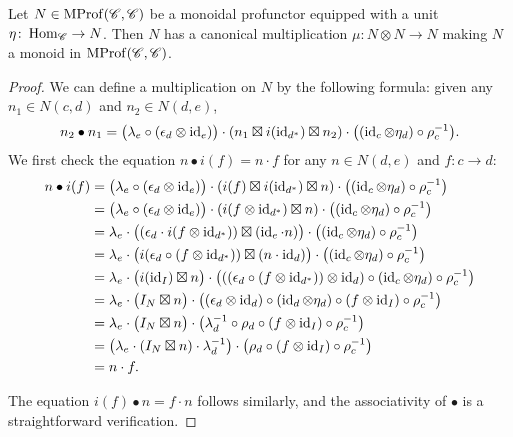 \begin{proposition}
	Let $N\in\operatorname{MProf}(\mathscr{C},\mathscr{C})$ be a monoidal profunctor equipped with a unit $\eta\colon\operatorname{Hom}_{\mathscr{C}}\to N$. Then $N$ has a canonical multiplication $\mu\colon N\otimes N\to N$ making $N$ a monoid in $\operatorname{MProf}(\mathscr{C},\mathscr{C})$.
\end{proposition}
\begin{proof}
	We can define a multiplication on $N$ by the following formula: given any $n_1\in N(c,d)$ and $n_2\in N(d,e)$,
	\[
		n_2\bullet n_1 = \bigl(\lambda_e\circ(\epsilon_d\otimes\operatorname{id}_e)\bigr)\cdot(n_1\boxtimes i(\operatorname{id}_{d^*})\boxtimes n_2)\cdot\bigl((\operatorname{id}_c\otimes \eta_d)\circ\rho_c^{-1}\bigr).
	\]
	We first check the equation $n\bullet i(f)=n\cdot f$ for any $n\in N(d,e)$ and $f\colon c\to d$:
	\begin{align*}
		n\bullet i(f) &= \bigl(\lambda_e\circ(\epsilon_d\otimes\operatorname{id}_e)\bigr)\cdot(i(f)\boxtimes i(\operatorname{id}_{d^*})\boxtimes n)\cdot\bigl((\operatorname{id}_c\otimes \eta_d)\circ\rho_c^{-1}\bigr) \\
		&= \bigl(\lambda_e\circ(\epsilon_d\otimes\operatorname{id}_e)\bigr)\cdot(i(f\otimes\operatorname{id}_{d^*})\boxtimes n)\cdot\bigl((\operatorname{id}_c\otimes \eta_d)\circ\rho_c^{-1}\bigr) \\
		&= \lambda_e\cdot\bigl((\epsilon_d\cdot i(f\otimes \operatorname{id}_{d^*}))\boxtimes (\operatorname{id}_e\cdot n)\bigr)\cdot\bigl((\operatorname{id}_c\otimes \eta_d)\circ\rho_c^{-1}\bigr) \\
		&= \lambda_e\cdot\bigl(i(\epsilon_d\circ (f\otimes \operatorname{id}_{d^*}))\boxtimes (n\cdot\operatorname{id}_d)\bigr)\cdot\bigl((\operatorname{id}_c\otimes \eta_d)\circ\rho_c^{-1}\bigr) \\
		&= \lambda_e\cdot\bigl(i(\operatorname{id}_I)\boxtimes n\bigr)\cdot\bigl(((\epsilon_d\circ (f\otimes \operatorname{id}_{d^*}))\otimes\operatorname{id}_d)\circ(\operatorname{id}_c\otimes \eta_d)\circ\rho_c^{-1}\bigr) \\
		&= \lambda_e\cdot\bigl(I_N\boxtimes n\bigr)\cdot\bigl((\epsilon_d\otimes\operatorname{id}_d)\circ(\operatorname{id}_d\otimes\eta_d)\circ(f\otimes\operatorname{id}_I)\circ\rho_c^{-1}\bigr) \\
		&= \lambda_e\cdot\bigl(I_N\boxtimes n\bigr)\cdot\bigl(\lambda_d^{-1}\circ\rho_d\circ(f\otimes\operatorname{id}_I)\circ\rho_c^{-1}\bigr) \\
		&= \bigl(\lambda_e\cdot(I_N\boxtimes n)\cdot\lambda_d^{-1}\bigr)\cdot\bigl(\rho_d\circ(f\otimes\operatorname{id}_I)\circ\rho_c^{-1}\bigr) \\
		&= n\cdot f.
	\end{align*}

	The equation $i(f)\bullet n=f\cdot n$ follows similarly, and the associativity of $\bullet$ is a straightforward verification.


\end{proof}
